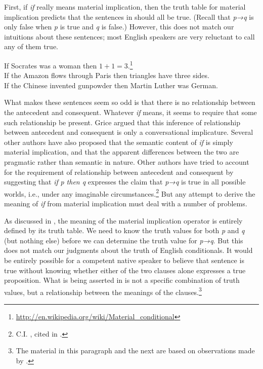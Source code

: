 First, if \textit{if} really means material implication, then the truth table for material implication predicts that the sentences in  should all be true. (Recall that \textit{p→q} is only false when \textit{p} is true and \textit{q} is false.) However, this does not match our intuitions about these sentences; most English speakers are very reluctant to call any of them true.


\ea \label{ex:19.21}
\ea  If Socrates was a woman then $1+1=3$.\footnote{\url{http://en.wikipedia.org/wiki/Material_conditional}} \\
\ex If the Amazon flows through Paris then triangles have three sides.\\
\ex If the Chinese invented gunpowder then Martin Luther was German.
                       \z
\z


What makes these sentences seem so odd is that there is no relationship between the antecedent and consequent. Whatever \textit{if} means, it seems to require that some such relationship be present. Grice argued that this inference of relationship between antecedent and consequent is only a conversational implicature. Several other authors have also proposed that the semantic content of \textit{if} is simply material implication, and that the apparent differences between the two are pragmatic rather than semantic in nature. Other authors have tried to account for the requirement of relationship between antecedent and consequent by suggesting that \textit{if} \textit{p then q} expresses the claim that \textit{p→q} is true in all possible worlds, i.e., under any imaginable circumstances.\footnote{C.I. \citet{Lewis1918}, cited in \citet{vonFintel2011}.} But any attempt to derive the meaning of \textit{if} from material implication must deal with a number of problems.



As discussed in , the meaning of the material implication operator is entirely defined by its truth table. We need to know the truth values for both \textit{p} and \textit{q} (but nothing else) before we can determine the truth value for \textit{p→q}. But this does not match our judgments about the truth of English conditionals. It would be entirely possible for a competent native speaker to believe that sentence  is true without knowing whether either of the two clauses alone expresses a true proposition. What is being asserted in  is not a specific combination of truth values, but a relationship between the meanings of the clauses.\footnote{The material in this paragraph and the next are based on observations made by \citet{Podlesskaya2001}.}


